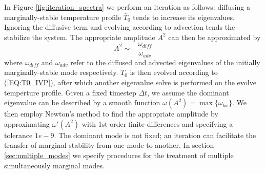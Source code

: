 \documentclass[reprint,amsmath,amssymb,aps]{revtex4-1}
\begin{document}
In Figure \ref{fig:iteration_spectra} we perform an iteration as follows: diffusing a marginally-stable temperature profile $\bar{T}_0$ tends to increase its eigenvalues. Ignoring the diffusive term and evolving according to advection tends the stabilize the system. The appropriate amplitude $A^2$ can then be approximated by
\begin{equation}
    A^2 \sim -\frac{\omega_{diff}}{\omega_{adv}}
\end{equation}
where $\omega_{diff}$ and $\omega_{adv}$ refer to the diffused and advected eigenvalues of the initially marginally-stable mode respectively. $\bar{T}_0$ is then evolved according to (\ref{EQ:T0_IVP}), after which another eigenvalue solve is performed on the evolve temperture profile. Given a fixed timestep $\Delta t$, we assume the dominant eigenvalue can be described by a smooth function $\omega (A^2) = \max \{ \omega_{kx} \}$. We then employ Newton's method to find the appropriate amplitude by approximating $\omega'(A^2)$ with 1st-order finite-differences and specifying a tolerance $1e-9$. The dominant mode is not fixed; an iteration can facilitate the transfer of marginal stability from one mode to another. In section \ref{sec:multiple_modes} we specify procedures for the treatment of multiple simultaneously marginal modes.
\end{document}

